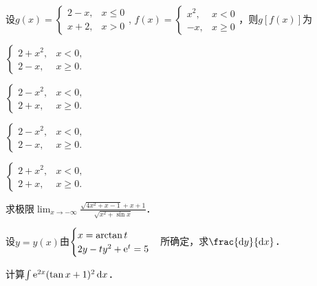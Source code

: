 \documentclass[plain,noanswer,medmath]{../../template/jnuexam}
\begin{document}


\begin{problem}
设$g(x) = \begin{cases}
  2 - x, & x \le 0 \\
  x + 2, & x > 0
\end{cases}$, $f(x) = \begin{cases}
  x^2, & x < 0 \\
   -x, & x \ge 0
\end{cases}$，则$g[f(x)]$为\pickout{}
\begin{abcd}
\item $\begin{cases}
  2 + x^2, & x < 0, \\
    2 - x, & x \ge 0.
\end{cases}$
\item $\begin{cases}
  2 - x^2, & x < 0, \\
    2 + x, & x \ge 0.
\end{cases}$
\item $\begin{cases}
  2 - x^2, & x < 0, \\
    2 - x, & x \ge 0.
\end{cases}$
\item $\begin{cases}
  2 + x^2, & x < 0, \\
    2 + x, & x \ge 0.
\end{cases}$
\end{abcd}
\end{problem}




\begin{problem}
求极限$\lim_{x \to -\infty} \frac{\sqrt{4x^2 + x - 1} + x + 1}{\sqrt{x^2 + \sin x}}$．
\end{problem}


\begin{problem}
设$y = y(x)$由$\begin{cases}
  x = \arctan t \\
  2y - ty^2 + \mathrm{e}^t = 5
\end{cases}$所确定，求$\frac{\dy}{\dx}$．
\end{problem}


\begin{problem}
计算$\int \mathrm{e}^{2x} (\tan x + 1)^2 \mathop{}\!\mathrm{d} x$．
\end{problem}
\end{document}

